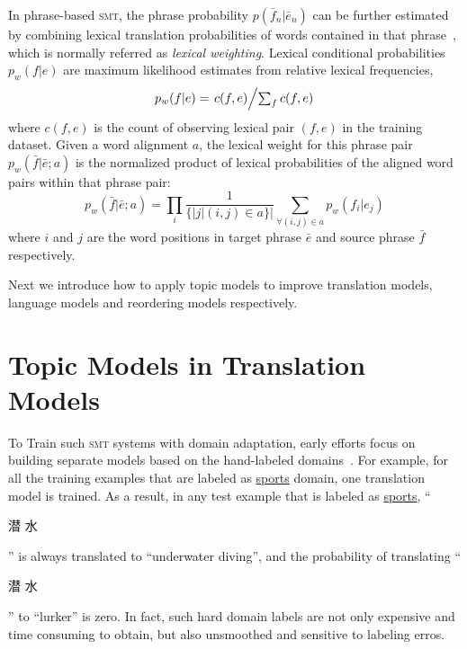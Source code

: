In phrase-based \textsc{smt}, the phrase probability $p(\bar{f}_n |
\bar{e}_n)$ can be further estimated by combining lexical translation
probabilities of words contained in that phrase~\citep{koehn-03},
which is normally referred as \textit{lexical weighting}. Lexical
conditional probabilities $p_w(f|e)$ are maximum likelihood estimates
from relative lexical frequencies,
\begin{equation}
\label{eq:lexical_prob}
p_w(f|e) = \textstyle \left.c(f, e)\middle/\sum_f{c(f, e)}\right.
\end{equation}
where $c(f, e)$ is the count of observing lexical pair $(f, e)$ in the
training dataset. Given a word alignment $a$, the lexical weight for
this phrase pair $p_w(\bar{f} | \bar{e}; a)$ is the normalized product
of lexical probabilities of the aligned word pairs within that phrase
pair:
\begin{equation}
\label{eq:phrase_prob}
p_w(\bar{f} | \bar{e}; a) = \prod_{i} \frac{1}{\{|j | (i, j) \in a\}|} \sum_{\forall (i,j) \in a} p_w(f_i | e_j)
\end{equation}
where $i$ and $j$ are the word positions in target phrase $\bar{e}$
and source phrase $\bar{f}$ respectively.

Next we introduce how to apply topic models to improve translation
models, language models and reordering models respectively.


\section{Topic Models in Translation Models}

To Train such \textsc{smt} systems with domain adaptation, early
efforts focus on building separate models based on the hand-labeled
domains~\citep{foster-07,matsoukas-09,chiang-11}. For example, for all
the training examples that are labeled as \underline{sports} domain,
one translation model is trained. As a result, in any test example
that is labeled as \underline{sports}, ``\begin{CJK*}{UTF8}{gbsn}潜
  水\end{CJK*}'' is always translated to ``underwater diving'', and
  the probability of translating ``\begin{CJK*}{UTF8}{gbsn}潜
    水\end{CJK*}'' to ``lurker'' is zero. In fact, such hard domain
    labels are not only expensive and time consuming to obtain, but
    also unsmoothed and sensitive to labeling erros.


